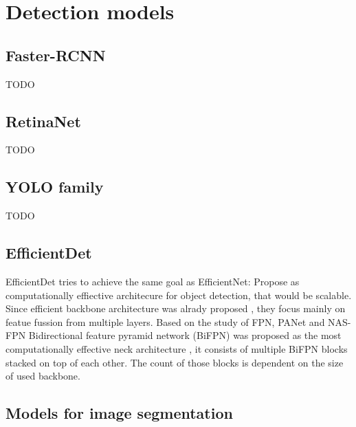 \section{Detection models}

\subsection{Faster-RCNN}
TODO

\subsection{RetinaNet}
TODO

\subsection{YOLO family}
TODO

\subsection{EfficientDet}
EfficientDet tries to achieve the same goal as EfficientNet: Propose as computationally effiective architecure for object detection, that would be scalable. Since efficient backbone architecture was alrady proposed \cite{Tan2019a}, they focus mainly on featue fussion from multiple layers. Based on the study of FPN, PANet and NAS-FPN Bidirectional feature pyramid network (BiFPN) was proposed as the most computationally effective neck architecture \cite{Tan2019}, it consists of multiple BiFPN blocks stacked on top of each other. The count of those blocks is dependent on the size of used backbone.

\subsection{Models for image segmentation}
